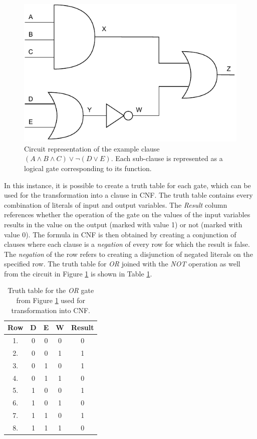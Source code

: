 \begin{figure}[ht]
    \label{fig:tsey}
    \centering
    \includegraphics[width=0.5\linewidth]{obrazky-figures/tseytin_diagram.drawio.pdf}
    \caption{Circuit representation of the example clause $(A \land B \land C) \lor \neg (D \lor E)$. Each sub-clause is represented as a logical gate corresponding to its function.}
\end{figure}
\vspace{0.3cm}

In this instance, it is possible to create a truth table for each gate, which can be used for the transformation into a clause in CNF. The truth table contains every combination of literals of input and output variables. The \textit{Result} column references whether the operation of the gate on the values of the input variables results in the value on the output (marked with value 1) or not (marked with value 0). The formula in CNF is then obtained by creating a conjunction of clauses where each clause is a \textit{negation} of every row for which the result is false. The \textit{negation} of the row refers to creating a disjunction of negated literals on the specified row. The truth table for \textit{OR} joined with the \textit{NOT} operation as well from the circuit in Figure \ref{fig:tsey} is shown in Table \ref{tab:truth_table}.


\begin{table}[!hbt]
    \centering
    \label{tab:truth_table}
    \caption{Truth table for the \textit{OR} gate from Figure \ref{fig:tsey} used for transformation into CNF.}
    \vspace{0.3cm}
    \begin{tabular}{|c||c|c|c||c|} \hline
         \textbf{Row} &\textbf{D} & \textbf{E} & \textbf{W} & \textbf{Result}
           \\ \hline \hline
         1. &   0    &   0   &   0   &   0 \\ \hline
         2. &   0    &   0   &   1   &   1 \\ \hline
         3. &   0    &   1   &   0   &   1 \\ \hline
         4. &   0    &   1   &   1   &   0 \\ \hline
         5. &   1    &   0   &   0   &   1 \\ \hline
         6. &   1    &   0   &   1   &   0 \\ \hline
         7. &   1    &   1   &   0   &   1 \\ \hline
         8. &   1    &   1   &   1   &   0 \\ \hline
    \end{tabular}
\end{table}

